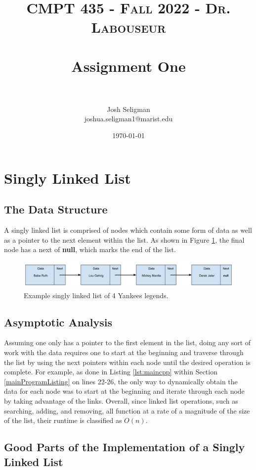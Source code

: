 \documentclass[letterpaper, 10pt,DIV=13]{scrartcl}
\title{	
   \normalfont \normalsize 
   \textsc{CMPT 435 - Fall 2022 - Dr. Labouseur} \\[10pt] %
   \horrule{0.5pt} \\[0.25cm] 	%
   \huge Assignment One  \\     	    %
   \horrule{0.5pt} \\[0.25cm] 	%
}
\author{Josh Seligman \\ \normalsize joshua.seligman1@marist.edu}
\date{\normalsize\today} 	%
\numberwithin{equation}{section} %
\numberwithin{figure}{section} %
\numberwithin{table}{section} %
\begin{document}
\maketitle %

\section{Singly Linked List}\label{linkedListSection}
\subsection{The Data Structure}\label{linkedListDataStructure}
A singly linked list is comprised of nodes which contain some form of data as well as a pointer to the next element within the list. As shown in Figure \ref{figure:linkedList}, the final node has a next of \textbf{null}, which marks the end of the list.

\begin{figure}[ht] 
    \centering 
    \includegraphics[width=15cm]{linkedList}
    \caption{Example singly linked list of 4 Yankees legends.}
    \label{figure:linkedList}
 \end{figure}

\subsection{Asymptotic Analysis}
Assuming one only has a pointer to the first element in the list, doing any sort of work with the data requires one to start at the beginning and traverse through the list by using the next pointers within each node until the desired operation is complete. For example, as done in Listing \ref{lst:maincpp} within Section \ref{mainProgramListing} on lines 22-26, the only way to dynamically obtain the data for each node was to start at the beginning and iterate through each node by taking advantage of the links. Overall, since linked list operations, such as searching, adding, and removing, all function at a rate of a magnitude of the size of the list, their runtime is classified as $O(n)$.

\subsection{Good Parts of the Implementation of a Singly Linked List}
\end{document}

